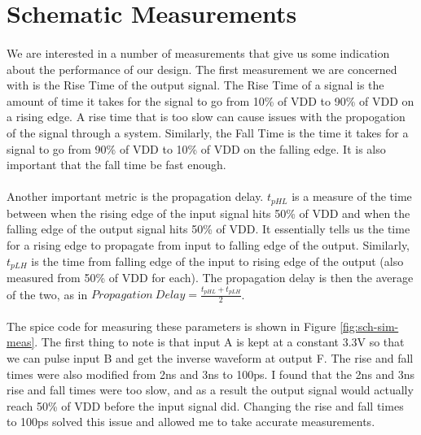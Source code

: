 \documentclass{article}
\begin{document}
\section{Schematic Measurements}
  \paragraph{}
  We are interested in a number of measurements that give us some indication about the performance of our design. The first measurement we are concerned with is the Rise Time of the output signal. The Rise Time of a signal is the amount of time it takes for the signal to go from 10\% of VDD to 90\% of VDD on a rising edge. A rise time that is too slow can cause issues with the propogation of the signal through a system. Similarly, the Fall Time is the time it takes for a signal to go from 90\% of VDD to 10\% of VDD on the falling edge. It is also important that the fall time be fast enough. 

  \paragraph{}
  Another important metric is the propagation delay. $t_{pHL}$ is a measure of the time between when the rising edge of the input signal hits 50\% of VDD and when the falling edge of the output signal hits 50\% of VDD. It essentially tells us the time for a rising edge to propagate from input to falling edge of the output. Similarly, $t_{pLH}$ is the time from falling edge of the input to rising edge of the output (also measured from 50\% of VDD for each). The propagation delay is then the average of the two, as in $Propagation\ Delay=\frac{t_{pHL}+t_{pLH}}{2}$.

  \paragraph{}
  The spice code for measuring these parameters is shown in Figure \ref{fig:sch-sim-meas}. The first thing to note is that input A is kept at a constant 3.3V so that we can pulse input B and get the inverse waveform at output F. The rise and fall times were also modified from 2ns and 3ns to 100ps. I found that the 2ns and 3ns rise and fall times were too slow, and as a result the output signal would actually reach 50\% of VDD before the input signal did. Changing the rise and fall times to 100ps solved this issue and allowed me to take accurate measurements. 
\end{document}
